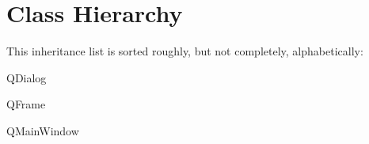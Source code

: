 \section{Class Hierarchy}
This inheritance list is sorted roughly, but not completely, alphabetically\-:\begin{DoxyCompactList}
\item {}
\item {}
\item Q\-Dialog\begin{DoxyCompactList}
\item {}
\item {}
\end{DoxyCompactList}
\item Q\-Frame\begin{DoxyCompactList}
\item {}
\end{DoxyCompactList}
\item Q\-Main\-Window\begin{DoxyCompactList}
\item {}
\end{DoxyCompactList}
\item {}
\end{DoxyCompactList}
